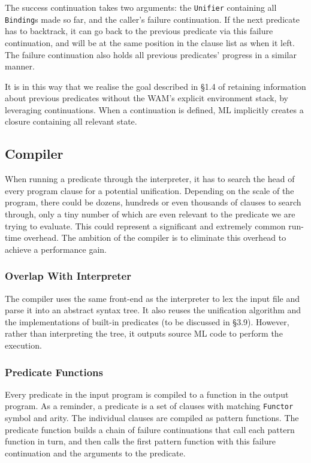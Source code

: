 \documentclass[12pt]{article}
\begin{document}

The success continuation takes two arguments: the \verb|Unifier| containing all \verb|Binding|s made so far, and the caller's failure continuation. 
If the next predicate has to backtrack, it can go back to the previous predicate via this failure continuation, and will be at the same position in the clause list as when it left. 
The failure continuation also holds all previous predicates' progress in a similar manner.


It is in this way that we realise the goal described in \S1.4 of retaining information about previous predicates without the WAM's explicit environment stack, by leveraging continuations. 
When a continuation is defined, ML implicitly creates a closure containing all relevant state.


\subsection{Compiler}

When running a predicate through the interpreter, it has to search the head of every program clause for a potential unification. 
Depending on the scale of the program, there could be dozens, hundreds or even thousands of clauses to search through, only a tiny number of which are even relevant to the predicate we are trying to evaluate.
This could represent a significant and extremely common run-time overhead. The ambition of the compiler is to eliminate this overhead to achieve a performance gain.

\subsubsection{Overlap With Interpreter}

The compiler uses the same front-end as the interpreter to lex the input file and parse it into an abstract syntax tree. 
It also reuses the unification algorithm and the implementations of built-in predicates (to be discussed in \S3.9). 
However, rather than interpreting the tree, it outputs source ML code to perform the execution.

\subsubsection{Predicate Functions}

Every predicate in the input program is compiled to a function in the output program. 
As a reminder, a predicate is a set of clauses with matching \verb|Functor| symbol and arity. 
The individual clauses are compiled as pattern functions. 
The predicate function builds a chain of failure continuations that call each pattern function in turn, and then calls the first pattern function with this failure continuation and the arguments to the predicate.
\end{document}
